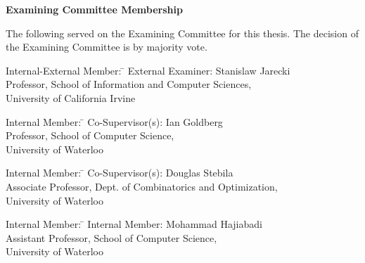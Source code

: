 \cleardoublepage %

\begin{center}\textbf{Examining Committee Membership}\end{center}
  \noindent
The following served on the Examining Committee for this thesis. The decision of the Examining Committee is by majority vote.
  \bigskip

  \noindent
\begin{tabbing}
Internal-External Member: \=  \kill %
External Examiner: \>  Stanislaw Jarecki  \\
\> Professor, School of Information and Computer Sciences,\\
\> University of California Irvine \\
\end{tabbing}
  \bigskip

  \noindent
\begin{tabbing}
Internal Member: \=  \kill %
Co-Supervisor(s): \> Ian Goldberg\\
\> Professor, School of Computer Science, \\
\> University of Waterloo \\
\end{tabbing}
  \bigskip

  \noindent
\begin{tabbing}
Internal Member: \=  \kill %
Co-Supervisor(s): \> Douglas Stebila \\
\> Associate Professor, Dept. of Combinatorics and Optimization, \\
\> University of Waterloo \\
\end{tabbing}
  \bigskip

  \noindent
  \begin{tabbing}
Internal Member: \=  \kill %
Internal Member: \> Mohammad Hajiabadi \\
\> Assistant Professor, School of Computer Science, \\
\> University of Waterloo \\
\end{tabbing}
  \bigskip

